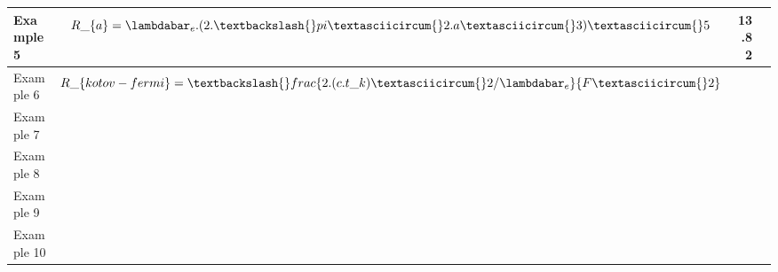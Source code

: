 \documentclass{article}
\begin{document}
\begin{table}[]
\begin{tabular}{|l|l|l|l|}
Example 5   & $$R\_\{a\}=\lambdabar_e.(2.\textbackslash{}pi\textasciicircum{}2.a\textasciicircum{}3)\textasciicircum{}5$$                                              & \multicolumn{1}{r|}{13.82}                                                                                                            &                                                                                               \\ \hline
Example 6   & $$R\_\{kotov-fermi\}=\textbackslash{}frac\{2.(c.t\_k)\textasciicircum{}2/\lambdabar_e\}\{F\textasciicircum{}2\}$$                                        &                                                                                                                                       &                                                                                               \\ \hline
Example 7   &                                                                                                                                                  &                                                                                                                                       &                                                                                               \\ \hline
Example 8   &                                                                                                                                                  &                                                                                                                                       &                                                                                               \\ \hline
Example 9   &                                                                                                                                                  &                                                                                                                                       &                                                                                               \\ \hline
Example 10  &                                                                                                                                                  &                                                                                                                                       &                                                                                               \\ \hline

\end{tabular}
\end{table}
\end{document}
